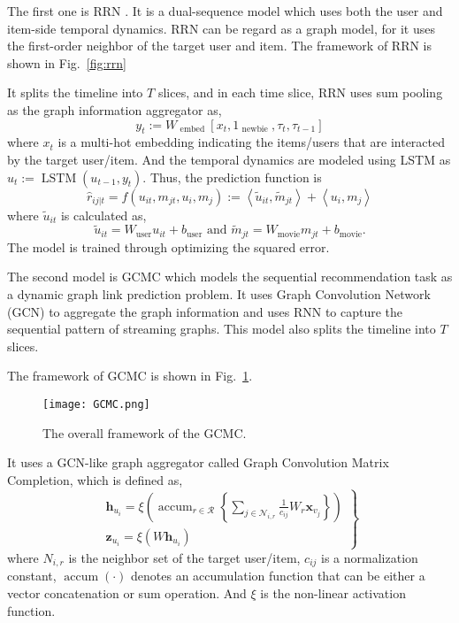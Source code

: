 The first one is RRN \cite{wu2017recurrent}. It is a dual-sequence model which
uses both the user and item-side temporal dynamics. RRN can be regard as a
graph model, for it uses the first-order neighbor of the target user and item.
The framework of RRN is shown in Fig.~\ref{fig:rrn}

It splits the timeline into $T$ slices, and in each time slice, RRN uses
sum pooling as the graph information aggregator as,
\begin{equation}
    y_{t} :=W_{\text { embed }}\left[x_{t}, 1_{\text { newbie }}, \tau_{t}, \tau_{t-1}\right]
\end{equation}
where $x_t$ is a multi-hot embedding indicating the items/users that are
interacted by the target user/item. And the temporal dynamics are modeled using
LSTM as $u_{t} :=\operatorname{LSTM}\left(u_{t-1}, y_{t}\right)$.
Thus, the prediction function is 
\begin{equation}
    \hat{r}_{i j | t}=f\left(u_{i t}, m_{j t}, u_{i}, m_{j}\right) :=\left\langle\tilde{u}_{i t}, \tilde{m}_{j t}\right\rangle+\left\langle u_{i}, m_{j}\right\rangle
\end{equation}
where $\tilde{u}_{i t}$ is calculated as,
\begin{equation}
    \tilde{u}_{i t}=W_{\mathrm{user}} u_{i t}+b_{\mathrm{user}} \text { and } \tilde{m}_{j t}=W_{\mathrm{movie}} m_{j t}+b_{\mathrm{movie}}.
\end{equation}
The model is trained through optimizing the squared error.


The second model is GCMC \cite{fadel2018link} which models the sequential
recommendation task as a dynamic graph link prediction problem. It uses Graph
Convolution Network (GCN) to aggregate the graph information and uses RNN
to capture the sequential pattern of streaming graphs. This model also splits
the timeline into $T$ slices.

The framework of GCMC is shown in Fig.~\ref{fig:gcmc}.

\begin{figure}[h]
	\centering
	\texttt{[image: GCMC.png]}
	\caption{The overall framework of the GCMC.}
	\label{fig:gcmc}
	\vspace{-10pt}
\end{figure}

It uses a GCN-like graph aggregator called Graph Convolution Matrix Completion,
which is defined as,
\begin{equation}
\left.\begin{array}{c}{\mathbf{h}_{u_{i}}=\xi\left(\operatorname{accum}_{r \in \mathcal{R}}\left\{\sum_{j \in \mathcal{N}_{i, r}} \frac{1}{c_{i j}} W_{r} \mathbf{x}_{v_{j}}\right\}\right)} \\ {\mathbf{z}_{u_{i}}=\xi\left(W \mathbf{h}_{u_{i}}\right)}\end{array}\right\}
\end{equation}
where $N_{i, r}$ is the neighbor set of the target user/item, $c_{ij}$ is a normalization constant,
$\operatorname{accum}(\cdot)$ denotes an accumulation function that 
can be either a vector concatenation or sum operation. And $\xi$ is the non-linear
activation function.


